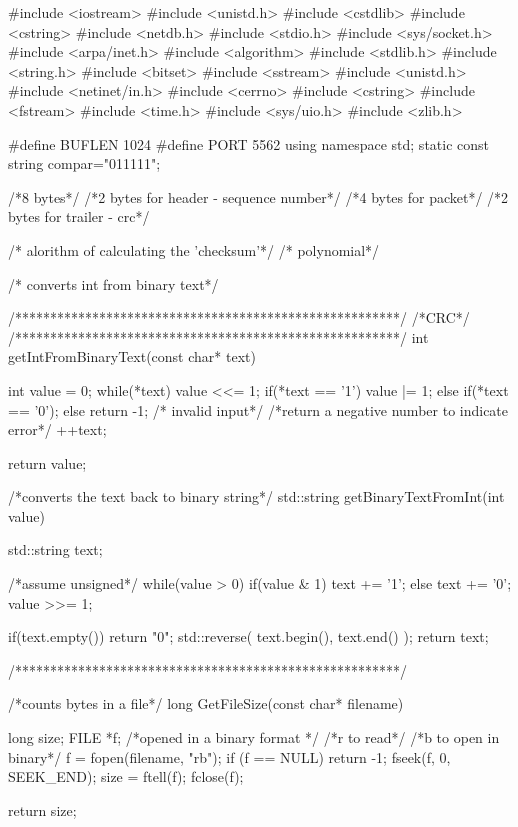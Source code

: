 \documentclass{article}
\begin{document}
\begin{titlepage}
	#include <iostream>
#include <unistd.h>
#include <cstdlib>
#include <cstring>
#include <netdb.h>
#include <stdio.h>
#include <sys/socket.h>
#include <arpa/inet.h>
#include <algorithm>
#include <stdlib.h>
#include <string.h>
#include <bitset>
#include <sstream>
#include <unistd.h>
#include <netinet/in.h>
#include <cerrno>
#include <cstring>
#include <fstream>
#include <time.h>
#include <sys/uio.h>
#include <zlib.h>

#define BUFLEN 1024
#define PORT 5562
using namespace std;
static const string compar="011111";

/*8 bytes*/
/*2 bytes for header - sequence number*/
/*4 bytes for packet*/
/*2 bytes for trailer - crc*/ 


/* alorithm of calculating the 'checksum'*/
 /* polynomial*/

/* converts int from binary text*/


/*******************************************************/
    	/*CRC*/
/*******************************************************/
int getIntFromBinaryText(const char* text)
{
    int value = 0;
    while(*text)
    {
        value <<= 1;
             if(*text == '1')
             {   
              	value |= 1;
              }
        else if(*text == '0');          
        else                     
        	return -1; /* invalid input*/
        	/*return a negative number to indicate error*/
        ++text;
    }
 
    return value;
}
/*converts the text back to binary string*/
std::string getBinaryTextFromInt(int value)
{
    std::string text;
    
 	/*assume unsigned*/
    while(value > 0)
    {
        if(value & 1)       
        {
        	text += '1';
        }
        else                
        {
        	text += '0';
        }
        value >>= 1;
    }
 
    if(text.empty())        
    {
    	return "0";
    }
    std::reverse( text.begin(), text.end() );       
    return text;
}
/*******************************************************/

/*counts bytes in a file*/
long GetFileSize(const char* filename)
{
    long size;
    FILE *f;
 /*opened in a binary format */
 /*r to read*/
 /*b to open in binary*/
    f = fopen(filename, "rb");
    if (f == NULL)
    {
    	return -1;
    }
    fseek(f, 0, SEEK_END);
    size = ftell(f);
    fclose(f);
 
    return size;
}



\end{titlepage}
\end{document}
